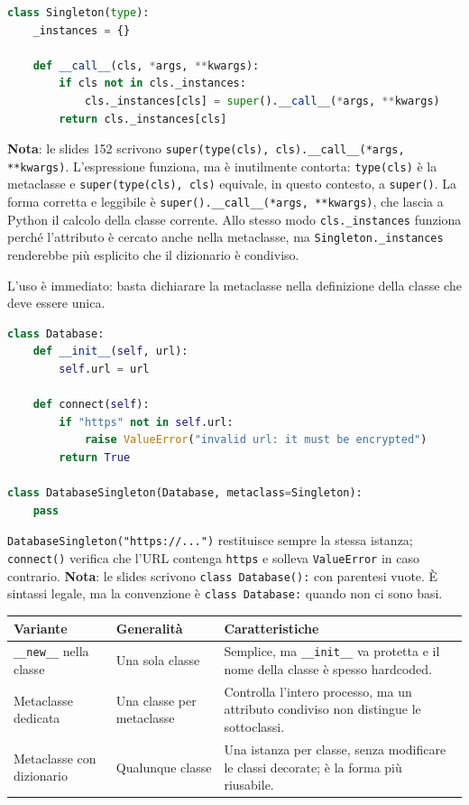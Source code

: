 \documentclass[12pt]{extarticle}
\begin{document}
\begin{lstlisting}[language=Python]
class Singleton(type):
    _instances = {}

    def __call__(cls, *args, **kwargs):
        if cls not in cls._instances:
            cls._instances[cls] = super().__call__(*args, **kwargs)
        return cls._instances[cls]
\end{lstlisting}

\noindent \textbf{Nota}: le slides 152 scrivono \texttt{super(type(cls), cls).\_\_call\_\_(*args, **kwargs)}. L'espressione funziona, ma è inutilmente contorta: \texttt{type(cls)} è la metaclasse e \texttt{super(type(cls), cls)} equivale, in questo contesto, a \texttt{super()}. La forma corretta e leggibile è \texttt{super().\_\_call\_\_(*args, **kwargs)}, che lascia a Python il calcolo della classe corrente. Allo stesso modo \texttt{cls.\_instances} funziona perché l'attributo è cercato anche nella metaclasse, ma \texttt{Singleton.\_instances} renderebbe più esplicito che il dizionario è condiviso.

\noindent L'uso è immediato: basta dichiarare la metaclasse nella definizione della classe che deve essere unica.

\begin{lstlisting}[language=Python]
class Database:
    def __init__(self, url):
        self.url = url

    def connect(self):
        if "https" not in self.url:
            raise ValueError("invalid url: it must be encrypted")
        return True

class DatabaseSingleton(Database, metaclass=Singleton):
    pass
\end{lstlisting}

\noindent \texttt{DatabaseSingleton("https://...")} restituisce sempre la stessa istanza; \texttt{connect()} verifica che l'URL contenga \texttt{https} e solleva \texttt{ValueError} in caso contrario. \textbf{Nota}: le slides scrivono \texttt{class Database():} con parentesi vuote. È sintassi legale, ma la convenzione è \texttt{class Database:} quando non ci sono basi.

\begin{center}
\small
\begin{tabular}{p{4.2cm}p{4.0cm}p{6.2cm}}
    \toprule
    \textbf{Variante} & \textbf{Generalità} & \textbf{Caratteristiche} \\
    \midrule
    \texttt{\_\_new\_\_} nella classe & Una sola classe & Semplice, ma \texttt{\_\_init\_\_} va protetta e il nome della classe è spesso hardcoded. \\
    \addlinespace
    Metaclasse dedicata & Una classe per metaclasse & Controlla l'intero processo, ma un attributo condiviso non distingue le sottoclassi. \\
    \addlinespace
    Metaclasse con dizionario & Qualunque classe & Una istanza per classe, senza modificare le classi decorate; è la forma più riusabile. \\
    \bottomrule
\end{tabular}
\end{center}
\end{document}
